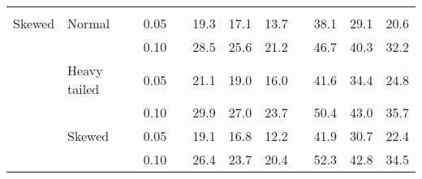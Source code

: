 \begin{table}[ht]
\begin{scriptsize}
\begin{center}
\begin{tabular}{ll p{.1cm} c p{.1cm} rrr p{.1cm} rrr}
&&&&&&&&&&&\\
Skewed       & Normal       && 0.05 &&   19.3 & 17.1 & 13.7 &   & 38.1 & 29.1 & 20.6 \\ 
             &              && 0.10 &&   28.5 & 25.6 & 21.2 &   & 46.7 & 40.3 & 32.2 \\ 
             & Heavy tailed && 0.05 &&   21.1 & 19.0 & 16.0 &   & 41.6 & 34.4 & 24.8 \\ 
             &              && 0.10 &&   29.9 & 27.0 & 23.7 &   & 50.4 & 43.0 & 35.7 \\ 
             & Skewed       && 0.05 &&   19.1 & 16.8 & 12.2 &   & 41.9 & 30.7 & 22.4 \\ 
             &              && 0.10 &&   26.4 & 23.7 & 20.4 &   & 52.3 & 42.8 & 34.5 \\ 


\end{tabular}
\end{center}
\end{scriptsize}
\end{table}
